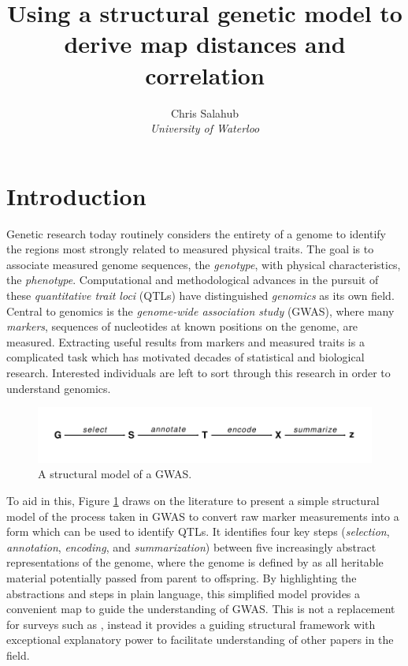\documentclass{article}
\title{Using a structural genetic model to derive map distances and correlation}
\author{Chris Salahub \\
	\textit{University of Waterloo}}
\begin{document}
	
\maketitle

\section{Introduction} \label{sec:intro}

Genetic research today routinely considers the entirety of a genome to identify the regions most strongly related to measured physical traits. The goal is to associate measured genome sequences, the \emph{genotype}, with physical characteristics, the \emph{phenotype}. Computational and methodological advances in the pursuit of these \emph{quantitative trait loci} (QTLs) have distinguished \emph{genomics} as its own field. Central to genomics is the \emph{genome-wide association study} (GWAS), where many \emph{markers}, sequences of nucleotides at known positions on the genome, are measured. Extracting useful results from markers and measured traits is a complicated task which has motivated decades of statistical and biological research. Interested individuals are left to sort through this research in order to understand genomics.

\begin{figure}[!ht]
  \begin{center}
  \includegraphics[scale = 1]{./img/modelDiagram.pdf}
  \caption{A structural model of a GWAS.}
  \label{fig:modelDiagram}
\end{center}
\end{figure}

To aid in this, Figure \ref{fig:modelDiagram} draws on the literature to present a simple structural model of the process taken in GWAS to convert raw marker measurements into a form which can be used to identify QTLs. It identifies four key steps (\emph{selection}, \emph{annotation}, \emph{encoding}, and \emph{summarization}) between five increasingly abstract representations of the genome, where the genome is defined by \cite{doergeetal1997search} as all heritable material potentially passed from parent to offspring. By highlighting the abstractions and steps in plain language, this simplified model provides a convenient map to guide the understanding of GWAS. This is not a replacement for surveys such as \cite{uffelmannetal2021gwas, tametal2019benefits}, instead it provides a guiding structural framework with exceptional explanatory power to facilitate understanding of other papers in the field.
\end{document}
